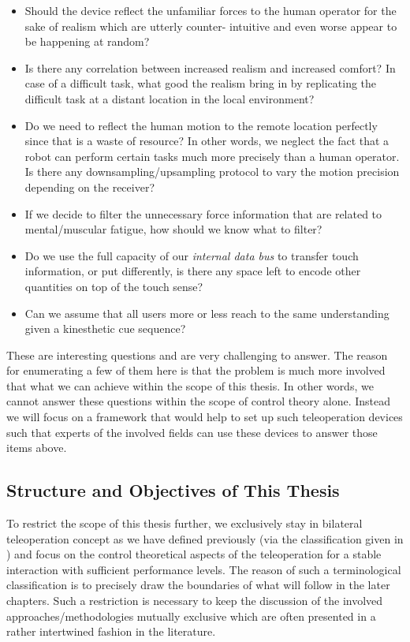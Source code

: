 \begin{itemize}
	\item Should the device reflect the unfamiliar forces to the human operator for the sake of realism which are utterly counter-
intuitive and even worse appear to be happening at random? 
    \item Is there any correlation between increased realism and increased comfort? In case of a difficult task, what good the realism 
bring in by replicating the difficult task at a distant location in the local environment?
    \item Do we need to reflect the human motion to the remote location perfectly since that is a waste of resource? In other words, we 
neglect the fact that a robot can perform certain tasks much more precisely than a human operator. Is there any downsampling/upsampling 
protocol to vary the motion precision depending on the receiver?
    \item If we decide to filter the unnecessary force information that are related to mental/muscular fatigue, how should we know what 
to filter? 
    \item Do we use the full capacity of our \emph{internal data bus} to transfer touch information, or put differently, is there any 
space left to encode other quantities on top of the touch sense?
    \item Can we assume that all users more or less reach to the same understanding given a kinesthetic cue sequence?
\end{itemize}

These are interesting questions and are very challenging to answer. The reason for enumerating a few of them here is that the problem is 
much more involved that what we can achieve within the scope of this thesis. In other words, we cannot answer these questions within the 
scope of control theory alone. Instead we will focus on a framework that would help to set up such teleoperation devices such that 
experts of the involved fields can use these devices to answer those items above. 



\subsection{Structure and Objectives of This Thesis}
To restrict the scope of this thesis further, we exclusively stay in bilateral teleoperation concept as we have defined previously (via 
the classification given in ) and focus on the control theoretical aspects of the teleoperation for a stable 
interaction with sufficient performance levels. The reason of such a terminological classification is to precisely draw the boundaries of 
what will follow in the later chapters. Such a restriction is necessary to keep the discussion of the involved approaches/methodologies 
mutually exclusive which are often presented in a rather intertwined fashion in the literature.

